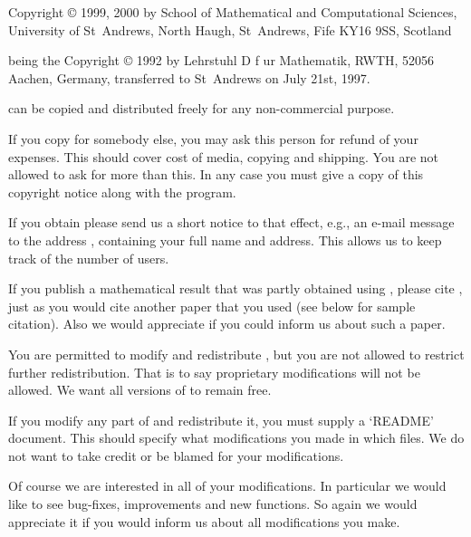 


Copyright {\copyright} 1999, 2000  by
        School of Mathematical and Computational Sciences,
        University of St~Andrews,
        North Haugh, St~Andrews, Fife KY16 9SS, Scotland

being the Copyright {\copyright} 1992 by
        Lehrstuhl D f{ u}r Mathematik, RWTH,
        52056 Aachen, Germany,
transferred to St~Andrews on July 21st, 1997.

\medskip

{\GAP}   can be copied   and  distributed freely  for any  non-commercial
purpose.

If you copy {\GAP} for somebody else, you may ask this person for  refund
of your expenses.  This should cover cost of media, copying and shipping.
You are not allowed to ask for more than this.  In any case you must give
a copy of this copyright notice along with the program.

If you obtain {\GAP} please send us  a short notice to that effect, e.g.,
an  e-mail  message   to  the  address  ,
containing your full  name and address.  This  allows us to keep track of
the number of {\GAP} users.

If you  publish  a mathematical  result  that  was  partly obtained using
{\GAP}, please cite {\GAP}, just as you would cite another paper that you
used (see below for sample citation). Also   we would appreciate if you
could inform us  about such a paper.

You  are permitted  to modify and  redistribute  {\GAP},  but you are not
allowed  to restrict further redistribution.  That is to say  proprietary
modifications will  not  be allowed.  We want all  versions  of {\GAP} to
remain free.

If you  modify any part of {\GAP} and redistribute it,  you must supply a
`README'  document.   This should specify what modifications you made  in
which  files.  We do  not  want  to take  credit  or  be blamed  for your
modifications.

Of course we are interested in all of your modifications.  In  particular
we would like to see bug-fixes, improvements and new functions.  So again
we would appreciate it if you would inform us about all modifications you
make.

